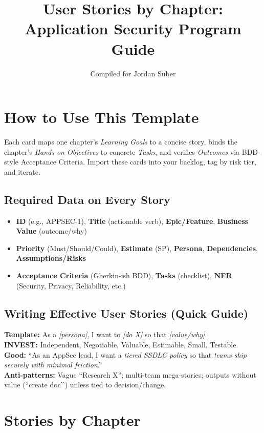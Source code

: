 \documentclass[11pt,a4paper]{article}
\title{\textbf{User Stories by Chapter:\\ Application Security Program Guide}}
\author{Compiled for Jordan Suber}
\date{}
\begin{document}
\maketitle
\tableofcontents
\newpage

\section*{How to Use This Template}
Each card maps one chapter’s \emph{Learning Goals} to a concise story, binds the chapter’s \emph{Hands-on Objectives} to concrete \emph{Tasks}, and verifies \emph{Outcomes} via BDD-style Acceptance Criteria. Import these cards into your backlog, tag by risk tier, and iterate.

\subsection*{Required Data on Every Story}
\begin{itemize}[itemsep=2pt,topsep=2pt]
  \item \textbf{ID} (e.g., APPSEC-1), \textbf{Title} (actionable verb), \textbf{Epic/Feature}, \textbf{Business Value} (outcome/why)
  \item \textbf{Priority} (Must/Should/Could), \textbf{Estimate} (SP), \textbf{Persona}, \textbf{Dependencies}, \textbf{Assumptions/Risks}
  \item \textbf{Acceptance Criteria} (Gherkin-ish BDD), \textbf{Tasks} (checklist), \textbf{NFR} (Security, Privacy, Reliability, etc.)
\end{itemize}

\subsection*{Writing Effective User Stories (Quick Guide)}
\textbf{Template:} As a \emph{[persona]}, I want to \emph{[do X]} so that \emph{[value/why]}.\\
\textbf{INVEST:} Independent, Negotiable, Valuable, Estimable, Small, Testable.\\
\textbf{Good:} “As an AppSec lead, I want a \emph{tiered SSDLC policy} so that \emph{teams ship securely with minimal friction}.”\\
\textbf{Anti-patterns:} Vague “Research X”; multi-team mega-stories; outputs without value (``create doc’’) unless tied to decision/change.

\newpage
\section{Stories by Chapter}
\end{document}
